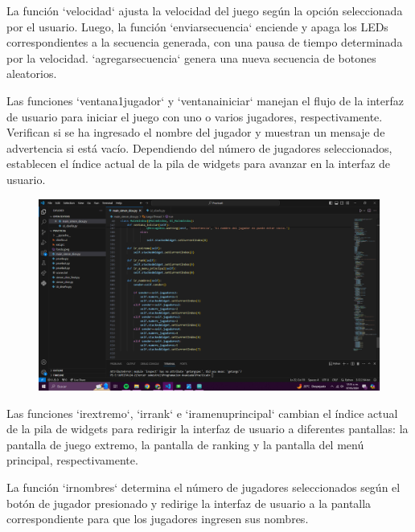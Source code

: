 \documentclass{article}
\begin{document}
{{\begin{figure}[h]
\end{figure}

{\Large La función `velocidad` ajusta la velocidad del juego según la opción seleccionada por el usuario. Luego, la función `enviarsecuencia` enciende y apaga los LEDs correspondientes a la secuencia generada, con una pausa de tiempo determinada por la velocidad. `agregarsecuencia` genera una nueva secuencia de botones aleatorios.

Las funciones `ventana1jugador` y `ventanainiciar` manejan el flujo de la interfaz de usuario para iniciar el juego con uno o varios jugadores, respectivamente. Verifican si se ha ingresado el nombre del jugador y muestran un mensaje de advertencia si está vacío. Dependiendo del número de jugadores seleccionados, establecen el índice actual de la pila de widgets para avanzar en la interfaz de usuario.

}

\newpage
\begin{figure}[h]
    \centering
    \includegraphics[width=1\textwidth]{Captura de pantalla (776).png}
    
\end{figure}

{\Large Las funciones `irextremo`, `irrank` e `iramenuprincipal` cambian el índice actual de la pila de widgets para redirigir la interfaz de usuario a diferentes pantallas: la pantalla de juego extremo, la pantalla de ranking y la pantalla del menú principal, respectivamente.

La función `irnombres` determina el número de jugadores seleccionados según el botón de jugador presionado y redirige la interfaz de usuario a la pantalla correspondiente para que los jugadores ingresen sus nombres.

}





}}
\end{document}
